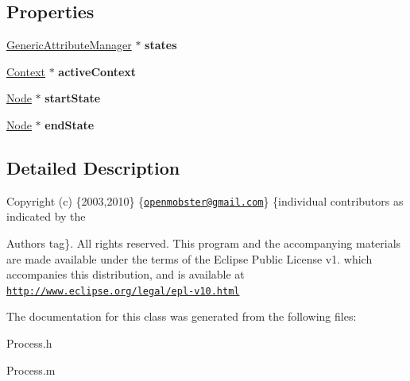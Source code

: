\subsection*{\-Properties}
\begin{DoxyCompactItemize}
\item 
\hypertarget{interface_process_a19c15a1a025bc71b2402e86c43607321}{
\hyperlink{interface_generic_attribute_manager}{\-Generic\-Attribute\-Manager} $\ast$ {\bfseries states}}
\label{interface_process_a19c15a1a025bc71b2402e86c43607321}

\item 
\hypertarget{interface_process_aba0365db90cfa5758c64250c794c67e3}{
\hyperlink{interface_context}{\-Context} $\ast$ {\bfseries active\-Context}}
\label{interface_process_aba0365db90cfa5758c64250c794c67e3}

\item 
\hypertarget{interface_process_a947149552b6df6c25dd37a8ec5c947be}{
\hyperlink{interface_node}{\-Node} $\ast$ {\bfseries start\-State}}
\label{interface_process_a947149552b6df6c25dd37a8ec5c947be}

\item 
\hypertarget{interface_process_a7b2577186857e729cad7d09d2b7ae7fe}{
\hyperlink{interface_node}{\-Node} $\ast$ {\bfseries end\-State}}
\label{interface_process_a7b2577186857e729cad7d09d2b7ae7fe}

\end{DoxyCompactItemize}


\subsection{\-Detailed \-Description}
\-Copyright (c) \{2003,2010\} \{\href{mailto:openmobster@gmail.com}{\tt openmobster@gmail.\-com}\} \{individual contributors as indicated by the \begin{DoxyAuthor}{\-Authors}
tag\}. \-All rights reserved. \-This program and the accompanying materials are made available under the terms of the \-Eclipse \-Public \-License v1. which accompanies this distribution, and is available at \href{http://www.eclipse.org/legal/epl-v10.html}{\tt http\-://www.\-eclipse.\-org/legal/epl-\/v10.\-html} 
\end{DoxyAuthor}


\-The documentation for this class was generated from the following files\-:\begin{DoxyCompactItemize}
\item 
\-Process.\-h\item 
\-Process.\-m\end{DoxyCompactItemize}

